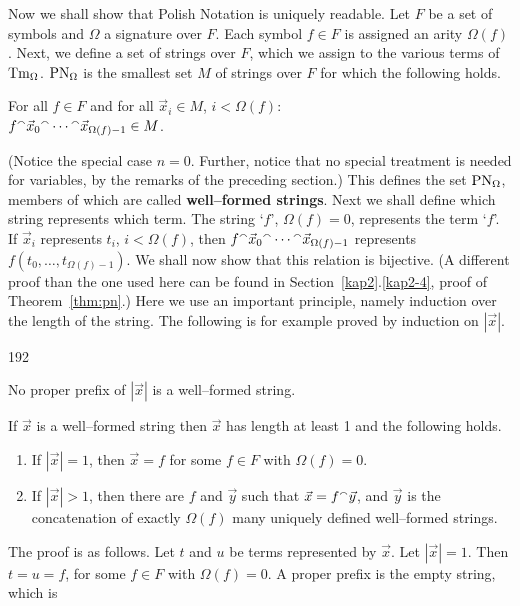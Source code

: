 Now we shall show that Polish Notation is uniquely readable.
Let $F$ be a set of symbols and $\Omega$ a signature over $F$.
Each symbol $f \in F$ is assigned an arity $\Omega(f)$. Next, 
we define a set of strings over $F$, which we assign to the various 
\index{$\PN_{\Omega}$}%
terms of $\operatorname{Tm}_{\Omega}$. $\PN_{\Omega}$ is the 
smallest set $M$ of strings over $F$ for which the following holds.
\begin{center}
For all $f \in F$ and for all $\vec{x}_i \in M$,
    $i < \Omega(f)$: \\
        $f {^{\smallfrown}} \vec{x}_0 {^{\smallfrown}} \dotsb {^{\smallfrown}} \vec{x}_{\Omega(f)-1}
            \in M$.
\end{center}
(Notice the special case $n = 0$. Further, notice that no special
treatment is needed for variables, by the remarks of the preceding
section.) This defines the set $\PN_{\Omega}$, members
of which are called \textbf{well--formed strings}. Next we
shall define which string represents which term.
The string `$f$', $\Omega(f) = 0$, represents the term `$f$'.
If $\vec{x}_i$ represents $t_i$,  $i < \Omega(f)$, then
$f {^{\smallfrown}} \vec{x}_0 {^{\smallfrown}} \dotsb {^{\smallfrown}} \vec{x}_{\Omega(f)-1}$
represents $f(t_0,\dotsc,t_{\Omega(f)-1})$. We shall
now show that this relation is bijective. (A different proof than 
the one used here can be found in Section~\ref{kap2}.\ref{kap2-4}, 
proof of Theorem~\ref{thm:pn}.) Here we use an important principle, 
namely induction over the length of the string. The following is 
for example proved by induction on $|\vec{x}|$.
\begin{dingautolist}{192}
\item No proper prefix of $|\vec{x}|$ is a well--formed string.
\item If $\vec{x}$  is a well--formed string
then $\vec{x}$ has length at least 1 and the following holds.
\begin{enumerate}
\item If $|\vec{x}| = 1$, then $\vec{x} = f$
    for some $f \in F$ with $\Omega(f) = 0$.
\item If $|\vec{x}| > 1$, then there are $f$ and $\vec{y}$ such that
    $\vec{x} = f {^{\smallfrown}} \vec{y}$, and $\vec{y}$ is the
    concatenation of exactly $\Omega(f)$ many uniquely
    defined well--formed strings.
\end{enumerate}
\end{dingautolist}
The proof is as follows. Let $t$ and $u$ be terms represented by
$\vec{x}$. Let  $|\vec{x}| = 1$. Then $t = u = f$, for some $f \in F$ 
with $\Omega(f) = 0$. A proper prefix is the empty string, which is 
